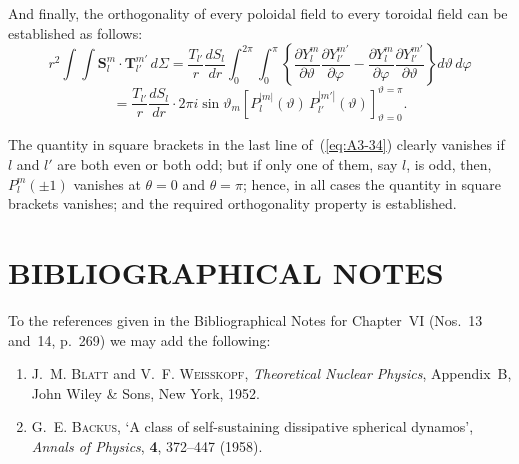 And finally, the orthogonality of every poloidal field to every toroidal field can be established as follows:
\begin{equation}
\label{eq:A3-34}
r^2 \int\!\!\int \mathbf{S}_l^m \cdot \mathbf{T}_{l'}^{m'} \, d\Sigma = \frac{T_{l'}}{r}\frac{dS_l}{dr} \int_0^{2\pi}\!\!\int_0^\pi \left\{ \frac{\partial Y_l^m}{\partial\vartheta}\frac{\partial Y_{l'}^{m'}}{\partial\varphi} - \frac{\partial Y_l^m}{\partial\varphi}\frac{\partial Y_{l'}^{m'}}{\partial\vartheta} \right\} d\vartheta\, d\varphi
\end{equation}
\[
= \frac{T_{l'}}{r}\frac{dS_l}{dr} \cdot 2\pi i \sin\vartheta_m \left[P_l^{|m|}(\vartheta)\,P_{l'}^{|m'|}(\vartheta)\right]_{\vartheta=0}^{\vartheta=\pi}.
\]

The quantity in square brackets in the last line of~(\ref{eq:A3-34}) clearly vanishes if $l$ and $l'$ are both even or both odd; but if only one of them, say $l$, is odd, then, $P_l^m(\pm 1)$ vanishes at $\theta = 0$ and $\theta = \pi$; hence, in all cases the quantity in square brackets vanishes; and the required orthogonality property is established.

\section*{BIBLIOGRAPHICAL NOTES}

To the references given in the Bibliographical Notes for Chapter~VI (Nos.~13 and~14, p.~269) we may add the following:
\begin{enumerate}
\item J.~M. \textsc{Blatt} and V.~F. \textsc{Weisskopf}, \textit{Theoretical Nuclear Physics}, Appendix~B, John Wiley \& Sons, New York, 1952.
\item G.~E. \textsc{Backus}, `A class of self-sustaining dissipative spherical dynamos', \textit{Annals of Physics}, \textbf{4}, 372--447 (1958).
\end{enumerate}

